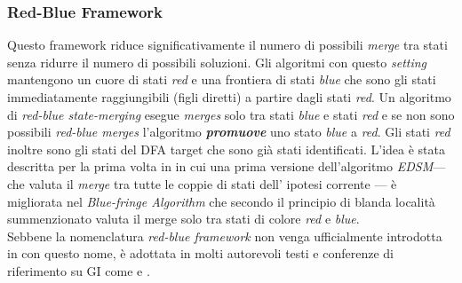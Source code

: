  \subsubsection{Red-Blue Framework}
 \label{subsub:rbf}
 Questo framework riduce significativamente il numero di possibili \textit{merge} tra stati senza ridurre il numero di possibili soluzioni. Gli algoritmi con questo \textit{setting} mantengono un cuore di stati \textit{red} e una frontiera di stati \textit{blue} che sono gli stati immediatamente raggiungibili (figli diretti) a partire dagli stati \textit{red}. Un algoritmo di \textit{red-blue state-merging} esegue \textit{merges} solo tra stati \textit{blue} e stati \textit{red} e se non sono possibili \textit{red-blue merges} l'algoritmo \textbf{\textit{promuove}} uno stato \textit{blue} a \textit{red}. Gli stati \textit{red} inoltre sono gli stati del \ac{DFA} target che sono già stati identificati.
L'idea è stata descritta per la prima volta in \cite{Abbadingo98} in cui una prima versione dell'algoritmo \textit{EDSM}--- che valuta il \textit{merge} tra tutte le coppie di stati dell' ipotesi corrente \cite[p. 6]{Abbadingo98} ---  è migliorata nel \textit{Blue-fringe Algorithm} che secondo il principio di blanda località summenzionato valuta il merge solo tra stati di colore \textit{red} e \textit{blue}.\\
Sebbene la nomenclatura \textit{red-blue framework} non venga ufficialmente introdotta in \cite{Abbadingo98} con questo nome, è adottata in molti autorevoli testi e conferenze di riferimento su \ac{GI} come \cite{DeLaHiguera10} e  \cite[p. 70] {RBF10}.

